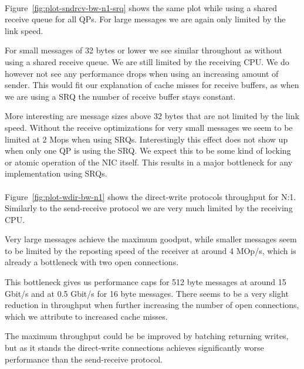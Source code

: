 \paragraph{} Figure~\ref{fig:plot-sndrcv-bw-n1-srq} shows the same plot while using a shared receive queue for all QPs. For
large messages we are again only limited by the link speed.

For small messages of 32 bytes or lower we see similar throughout as without using a shared receive queue. We are still
limited by the receiving CPU. We do however not see any performance drops when using an increasing amount of sender. This
would fit our explanation of cache misses for receive buffers, as when we are using a SRQ the number of receive buffer stays
constant.

More interesting are message sizes above 32 bytes that are not limited by the link speed. Without the receive optimizations 
for very small messages we seem to be limited at 2 Mops when using SRQs. Interestingly this effect does not show up when only
one QP is using the SRQ. We expect this to be some kind of locking or atomic operation of the NIC itself. This results in a
major bottleneck for any implementation using SRQs.

\paragraph{} Figure~\ref{fig:plot-wdir-bw-n1} shows the direct-write protocols throughput for N:1. Similarly to the 
send-receive protocol we are very much limited by the receiving CPU.

Very large messages achieve the maximum goodput,  while smaller messages seem to be limited by the reposting speed of the 
receiver at around 4 MOp/s, which is already a bottleneck with two open connections.

This bottleneck gives us performance caps for 512 byte messages at around 15 Gbit/s and at 0.5 Gbit/s for 16 byte messages.
There seems to be a very slight reduction in throughput when further increasing the number of open connections, which we 
attribute to increased cache misses.

The maximum throughput could be be improved by batching returning writes, but as it stands the direct-write connections
achieves significantly worse performance than the send-receive protocol.



